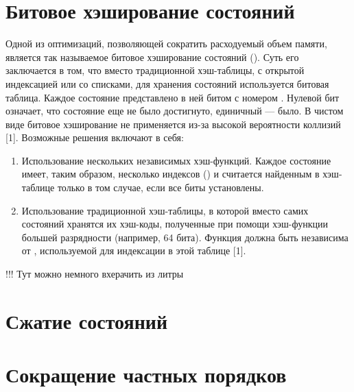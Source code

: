 \section{Битовое хэширование состояний}
\label{sec:bit-hashing}

Одной из оптимизаций, позволяющей сократить расходуемый объем памяти,
является так называемое битовое хэширование состояний (). Суть его заключается в том, что вместо традиционной
хэш-таблицы, с открытой индексацией или со списками, для хранения
состояний используется битовая таблица. Каждое состояние 
представлено в ней битом с номером . Нулевой бит означает,
что состояние еще не было достигнуто, единичный — было. В чистом виде
битовое хэширование не применяется из-за высокой вероятности коллизий
[1]. Возможные решения включают в себя:

\begin{enumerate}
\item Использование нескольких независимых хэш-функций. Каждое
  состояние имеет, таким образом, несколько индексов () и считается найденным в
  хэш-таблице только в том случае, если все биты 
  установлены.

\item Использование традиционной хэш-таблицы, в которой вместо самих
  состояний хранятся их хэш-коды, полученные при помощи хэш-функции
   большей разрядности (например, 64 бита). Функция 
  должна быть независима от , используемой для индексации в этой
  таблице [1].
\end{enumerate}

!!! Тут можно немного вхерачить из литры

\section{Сжатие состояний}
\label{sec:state-compression}


\section{Сокращение частных порядков}
\label{sec:partial-order-reduction}


